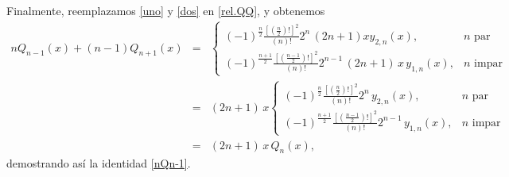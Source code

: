 Finalmente, reemplazamos \eqref{uno} y \eqref{dos} en \eqref{rel.QQ}, y obtenemos
\begin{eqnarray}
nQ_{n-1}(x)+(n-1)Q_{n+1}(x) &=&
   \begin{cases}
	(-1)^{\frac{n}{2}}\frac{[(\frac{n}{2})!]^2}{(n)!} 2^{n} \,(2n+1)xy_{2,n}(x), & n \text{ par}\\
	(-1)^{\frac{n+1}{2}}\frac{\left[\left(\frac{n-1}{2}\right)!\right]^2}{(n)!}2^{n-1}\, (2n+1)\,x\,y_{1,n}(x), & n \text{ impar}
	\end{cases}\\ 
	&=&(2n+1)\,x
   \begin{cases}
	(-1)^{\frac{n}{2}}\frac{[(\frac{n}{2})!]^2}{(n)!} 2^{n} \,y_{2,n}(x), & n \text{ par}\\
	(-1)^{\frac{n+1}{2}}\frac{\left[\left(\frac{n-1}{2}\right)!\right]^2}{(n)!}2^{n-1}\,y_{1,n}(x), & n \text{ impar}
	\end{cases} \\
	&=&  (2n+1)\,x\,Q_n(x),
\end{eqnarray}
demostrando así la identidad \eqref{nQn-1}.


